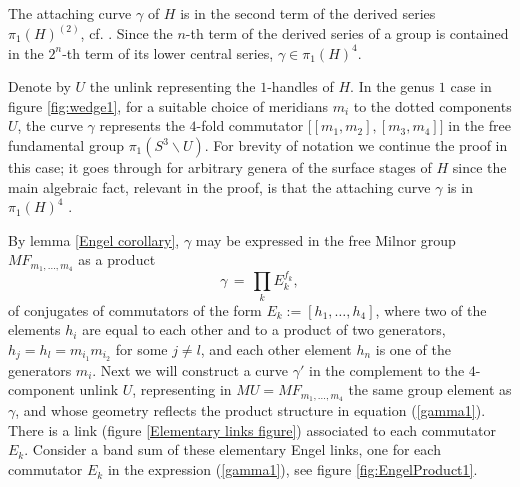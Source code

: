 \documentclass[12pt]{amsart}
\theoremstyle{definition}
\theoremstyle{remark}
\numberwithin{equation}{section}
\theoremstyle{plain}
\theoremstyle{definition}
\numberwithin{figure}{section}
\begin{document}
The attaching curve $\gamma$ of  $H$  is in the second term of the derived series ${\pi}_1(H)^{(2)}$, cf. \cite[Lemma 1.1]{FT}. 
Since the $n$-th term of the derived series of a group is contained in the $2^n$-th term of its lower central series,  ${\gamma}\in {\pi}_1 (H)^4$. 


Denote by $U$ the unlink representing the $1$-handles of $H$.
In the genus $1$ case in figure \ref{fig:wedge1},  for a suitable choice of meridians $m_i$ to the dotted components $U$, the curve $\gamma$  represents the $4$-fold commutator $\big[ [m_1,m_2],[m_3,m_4] \big]$ in the  free fundamental group  ${\pi}_1(S^3\smallsetminus U)$. For brevity of notation we continue the proof in this case; it goes through for arbitrary genera of the surface stages of $H$ since the main algebraic fact, relevant in the proof, is that the attaching curve $\gamma$ is in ${\pi}_1 (H)^4$ .
  
  
By lemma \ref{Engel corollary}, $\gamma$ may be expressed in the free Milnor group $MF_{m_1,\ldots, m_4}$  as a product 
\begin{equation} \label{gamma1}
{\gamma}\, =\, \prod_k E_k^{f_k},
\end{equation}
of conjugates of commutators of the form $E_k:=[h_1,\ldots, h_4]$, where two of the elements $h_i$ are equal to each other and to a product of two generators, $h_j = h_l=m_{i_1} m_{i_2}$ for some $j\neq l$, and each other element $h_n$ is one of the generators $m_i$. Next we will construct a curve ${\gamma}'$ in the complement to the $4$-component unlink $U$, representing in $MU=MF_{m_1,\ldots, m_4}$ the same group element as $\gamma$, and whose geometry reflects the product structure in equation (\ref{gamma1}). There is a link (figure \ref{Elementary links figure}) associated to each commutator $E_k$. Consider a band sum of these elementary Engel links, one for each commutator $E_k$ in the expression (\ref{gamma1}), see figure \ref{fig:EngelProduct1}. 
\end{document}
